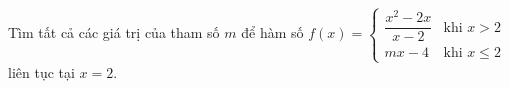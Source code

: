 \begin{ex}
Tìm tất cả các giá trị của tham số $m$ để hàm số $f(x)=\begin{cases}\dfrac{x^2-2x}{x-2}&\text{khi }x>2\\mx-4&\text{khi }x\le2\end{cases}$ liên tục tại $x=2$.
\end{ex}
